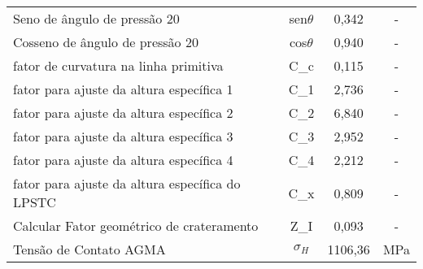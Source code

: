 \begin{table}[]
\begin{tabular}{lccc}
Seno de ângulo de pressão 20                                                                                                 & sen$\theta$           & 0,342          & -             \\
Cosseno de ângulo de pressão 20                                                                                              & cos$\theta$           & 0,940          & -             \\
fator de curvatura na linha primitiva                                                                                        & C_c             & 0,115          & -             \\
fator para ajuste da altura específica 1                                                                                     & C_1             & 2,736          & -             \\
fator para ajuste da altura específica 2                                                                                     & C_2             & 6,840          & -             \\
fator para ajuste da altura específica 3                                                                                     & C_3             & 2,952          & -             \\
fator para ajuste da altura específica 4                                                                                     & C_4             & 2,212          & -             \\
fator para ajuste da altura específica do LPSTC                                                                              & C_x             & 0,809          & -             \\
Calcular Fator geométrico de crateramento                                                                                    & Z_I             & 0,093          & -             \\
Tensão de Contato AGMA                                                                                                       & $\sigma_H$              & 1106,36        & MPa             \\ \hline  
\end{tabular}
\end{table}